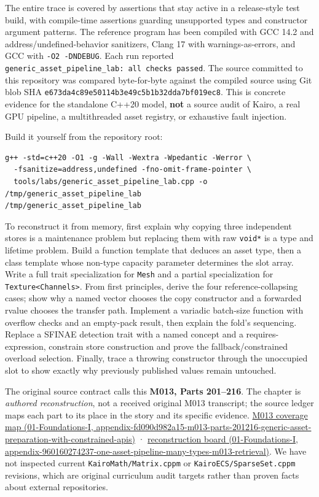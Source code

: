 The entire trace is covered by assertions that stay active in a release-style test build, with compile-time assertions guarding unsupported types and constructor argument patterns. The reference program has been compiled with GCC 14.2 and address/undefined-behavior sanitizers, Clang 17 with warnings-as-errors, and GCC with \texttt{-O2\ -DNDEBUG}. Each run reported \texttt{generic\_asset\_pipeline\_lab:\ all\ checks\ passed}. The source committed to this repository was compared byte-for-byte against the compiled source using Git blob SHA \texttt{e673da4c89e50114b3e49c5b1b32dda7bf019ec8}. This is concrete evidence for the standalone C++20 model, \textbf{not} a source audit of Kairo, a real GPU pipeline, a multithreaded asset registry, or exhaustive fault injection.

Build it yourself from the repository root:

\begin{verbatim}
g++ -std=c++20 -O1 -g -Wall -Wextra -Wpedantic -Werror \
  -fsanitize=address,undefined -fno-omit-frame-pointer \
  tools/labs/generic_asset_pipeline_lab.cpp -o /tmp/generic_asset_pipeline_lab
/tmp/generic_asset_pipeline_lab
\end{verbatim}

To reconstruct it from memory, first explain why copying three independent stores is a maintenance problem but replacing them with raw \texttt{void*} is a type and lifetime problem. Build a function template that deduces an asset type, then a class template whose non-type capacity parameter determines the slot array. Write a full trait specialization for \texttt{Mesh} and a partial specialization for \texttt{Texture\textless{}Channels\textgreater{}}. From first principles, derive the four reference-collapsing cases; show why a named vector chooses the copy constructor and a forwarded rvalue chooses the transfer path. Implement a variadic batch-size function with overflow checks and an empty-pack result, then explain the fold's sequencing. Replace a SFINAE detection trait with a named concept and a requires-expression, constrain store construction and prove the fallback/constrained overload selection. Finally, trace a throwing constructor through the unoccupied slot to show exactly why previously published values remain untouched.

The original source contract calls this \textbf{M013, Parts 201--216}. The chapter is \emph{authored reconstruction}, not a received original M013 transcript; the source ledger maps each part to its place in the story and its specific evidence. \href{../01-Foundations-I/main.pdf\#nameddest=appendix-fd090d982a15-m013-parts-201216-generic-asset-preparation-with-constrained-apis}{M013 coverage map (01-Foundations-I, appendix-fd090d982a15-m013-parts-201216-generic-asset-preparation-with-constrained-apis)} · \href{../01-Foundations-I/main.pdf\#nameddest=appendix-960160274237-one-asset-pipeline-many-types-m013-retrieval}{reconstruction board (01-Foundations-I, appendix-960160274237-one-asset-pipeline-many-types-m013-retrieval)}. We have not inspected current \texttt{KairoMath/Matrix.cppm} or \texttt{KairoECS/SparseSet.cppm} revisions, which are original curriculum audit targets rather than proven facts about external repositories.

